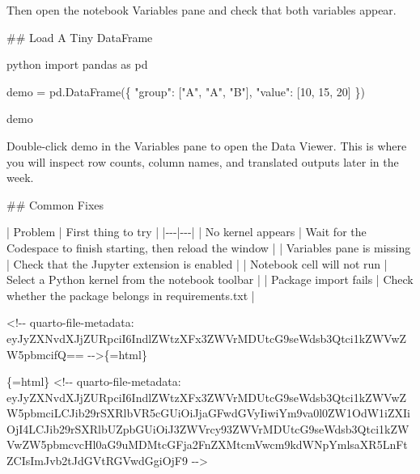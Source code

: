 \documentclass[
  letterpaper,
  DIV=11,
  numbers=noendperiod,
  oneside]{scrreprt}
\newenvironment{Shaded}{\begin{snugshade}}{\end{snugshade}}
\newcommand{\DecValTok}[1]{\textcolor[rgb]{0.68,0.00,0.00}{#1}}
\newcommand{\FunctionTok}[1]{\textcolor[rgb]{0.28,0.35,0.67}{#1}}
\newcommand{\ImportTok}[1]{\textcolor[rgb]{0.00,0.46,0.62}{#1}}
\newcommand{\InformationTok}[1]{\textcolor[rgb]{0.37,0.37,0.37}{#1}}
\newcommand{\NormalTok}[1]{\textcolor[rgb]{0.00,0.23,0.31}{#1}}
\newcommand{\OperatorTok}[1]{\textcolor[rgb]{0.37,0.37,0.37}{#1}}
\newcommand{\PreprocessorTok}[1]{\textcolor[rgb]{0.68,0.00,0.00}{#1}}
\newcommand{\StringTok}[1]{\textcolor[rgb]{0.13,0.47,0.30}{#1}}
\begin{document}
\begin{Shaded}
\begin{Highlighting}[numbers=left,,]
\NormalTok{Then open the notebook Variables pane and check that both variables appear.}

\FunctionTok{\#\# Load A Tiny DataFrame}

\InformationTok{\textasciigrave{}\textasciigrave{}\textasciigrave{}python}
\ImportTok{import}\NormalTok{ pandas }\ImportTok{as}\NormalTok{ pd}

\NormalTok{demo }\OperatorTok{=}\NormalTok{ pd.DataFrame(\{}
    \StringTok{"group"}\NormalTok{: [}\StringTok{"A"}\NormalTok{, }\StringTok{"A"}\NormalTok{, }\StringTok{"B"}\NormalTok{],}
    \StringTok{"value"}\NormalTok{: [}\DecValTok{10}\NormalTok{, }\DecValTok{15}\NormalTok{, }\DecValTok{20}\NormalTok{]}
\NormalTok{\})}

\NormalTok{demo}
\InformationTok{\textasciigrave{}\textasciigrave{}\textasciigrave{}}

\NormalTok{Double{-}click }\InformationTok{\textasciigrave{}demo\textasciigrave{}}\NormalTok{ in the Variables pane to open the Data Viewer. This is where you will inspect row counts, column names, and translated outputs later in the week.}

\FunctionTok{\#\# Common Fixes}

\PreprocessorTok{|}\NormalTok{ Problem }\PreprocessorTok{|}\NormalTok{ First thing to try }\PreprocessorTok{|}
\PreprocessorTok{|{-}{-}{-}|{-}{-}{-}|}
\PreprocessorTok{|}\NormalTok{ No kernel appears }\PreprocessorTok{|}\NormalTok{ Wait for the Codespace to finish starting, then reload the window }\PreprocessorTok{|}
\PreprocessorTok{|}\NormalTok{ Variables pane is missing }\PreprocessorTok{|}\NormalTok{ Check that the Jupyter extension is enabled }\PreprocessorTok{|}
\PreprocessorTok{|}\NormalTok{ Notebook cell will not run }\PreprocessorTok{|}\NormalTok{ Select a Python kernel from the notebook toolbar }\PreprocessorTok{|}
\PreprocessorTok{|}\NormalTok{ Package import fails }\PreprocessorTok{|}\NormalTok{ Check whether the package belongs in }\InformationTok{\textasciigrave{}requirements.txt\textasciigrave{}} \PreprocessorTok{|}


\InformationTok{\textasciigrave{}\textless{}!{-}{-} quarto{-}file{-}metadata: eyJyZXNvdXJjZURpciI6IndlZWtzXFx3ZWVrMDUtcG9seWdsb3Qtci1kZWVwZW5pbmcifQ== {-}{-}\textgreater{}\textasciigrave{}}\NormalTok{\{=html\}}

\InformationTok{\textasciigrave{}\textasciigrave{}\textasciigrave{}\{=html\}}
\InformationTok{\textless{}!{-}{-} quarto{-}file{-}metadata: eyJyZXNvdXJjZURpciI6IndlZWtzXFx3ZWVrMDUtcG9seWdsb3Qtci1kZWVwZW5pbmciLCJib29rSXRlbVR5cGUiOiJjaGFwdGVyIiwiYm9va0l0ZW1OdW1iZXIiOjI4LCJib29rSXRlbUZpbGUiOiJ3ZWVrcy93ZWVrMDUtcG9seWdsb3Qtci1kZWVwZW5pbmcvcHl0aG9uMDMtcGFja2FnZXMtcmVwcm9kdWNpYmlsaXR5LnFtZCIsImJvb2tJdGVtRGVwdGgiOjF9 {-}{-}\textgreater{}}
\InformationTok{\textasciigrave{}\textasciigrave{}\textasciigrave{}}


\end{Highlighting}
\end{Shaded}
\end{document}
